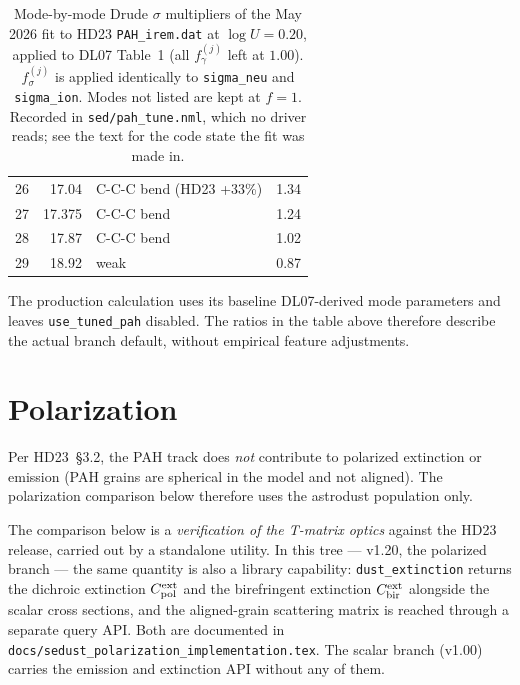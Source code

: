 \documentclass{my_memo}
\begin{document}
\begin{table}[h]
\begin{tabular}{r r l r}
 26 & 17.04  & C-C-C bend (HD23 +33\%)         & 1.34 \\
 27 & 17.375 & C-C-C bend                      & 1.24 \\
 28 & 17.87  & C-C-C bend                      & 1.02 \\
 29 & 18.92  & weak                            & 0.87 \\
\bottomrule
\end{tabular}
\caption{Mode-by-mode Drude $\sigma$ multipliers of the May 2026 fit to
HD23 \texttt{PAH\_irem.dat} at $\log U = 0.20$, applied to DL07
Table~1 (all $f^{(j)}_\gamma$ left at $1.00$). $f^{(j)}_\sigma$ is
applied identically to \texttt{sigma\_neu} and \texttt{sigma\_ion}.
Modes not listed are kept at $f = 1$. Recorded in
\texttt{sed/pah\_tune.nml}, which no driver reads; see the text for the
code state the fit was made in.}
\label{tab:pah_tune}
\end{table}

The production calculation uses its baseline DL07-derived
mode parameters and leaves \texttt{use\_tuned\_pah} disabled. The ratios in
the table above therefore describe the actual branch default, without
empirical feature adjustments.

\section{Polarization}

Per HD23~\S3.2, the PAH track does \emph{not} contribute to polarized
extinction or emission (PAH grains are spherical in the model and not
aligned). The polarization comparison below therefore uses the
astrodust population only.

The comparison below is a \emph{verification of the T-matrix optics}
against the HD23 release, carried out by a standalone utility. In this
tree --- v1.20, the polarized branch --- the same quantity is also a
library capability: \texttt{dust\_extinction} returns the dichroic
extinction $C_{\rm pol}^{\rm ext}$ and the birefringent extinction
$C_{\rm bir}^{\rm ext}$ alongside the scalar cross sections, and the
aligned-grain scattering matrix is reached through a separate query
API. Both are documented in
\texttt{docs/sedust\_polarization\_implementation.tex}. The scalar
branch (v1.00) carries the emission and extinction API without any of
them.
\end{document}
